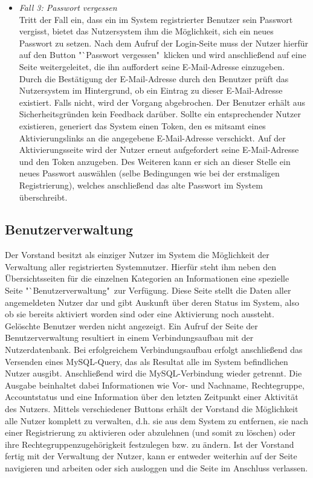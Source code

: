 \documentclass[fontsize = 12pt, paper = a4]{scrreprt}
\begin{document}
\begin{itemize}

\item \textit{Fall 3: Passwort vergessen} \\
Tritt der Fall ein, dass ein im System registrierter Benutzer sein Passwort vergisst, bietet das Nutzersystem ihm die Möglichkeit, sich ein neues Passwort zu setzen. Nach dem Aufruf der Login-Seite muss der Nutzer hierfür auf den Button "`Passwort vergessen"\ klicken und wird anschließend auf eine Seite weitergeleitet, die ihn auffordert seine E-Mail-Adresse einzugeben. Durch die Bestätigung der E-Mail-Adresse durch den Benutzer prüft das Nutzersystem im Hintergrund, ob ein Eintrag zu dieser E-Mail-Adresse existiert. Falls nicht, wird der Vorgang abgebrochen. Der Benutzer erhält aus Sicherheitsgründen kein Feedback darüber. Sollte ein entsprechender Nutzer existieren, generiert das System einen Token, den es mitsamt eines Aktivierungslinks an die angegebene E-Mail-Adresse verschickt. Auf der Aktivierungsseite wird der Nutzer erneut aufgefordert seine E-Mail-Adresse und den Token anzugeben. Des Weiteren kann er sich an dieser Stelle ein neues Passwort auswählen (selbe Bedingungen wie bei der erstmaligen Registrierung), welches anschließend das alte Passwort im System überschreibt.

\end{itemize}

\newpage

\subsection{Benutzerverwaltung}

Der Vorstand besitzt als einziger Nutzer im System die Möglichkeit der Verwaltung aller registrierten Systemnutzer. Hierfür steht ihm neben den Übersichtsseiten für die einzelnen Kategorien an Informationen eine spezielle Seite "`Benutzerverwaltung"\ zur Verfügung. Diese Seite stellt die Daten aller angemeldeten Nutzer dar und gibt Auskunft über deren Status im System, also ob sie bereits aktiviert worden sind oder eine Aktivierung noch aussteht. Gelöschte Benutzer werden nicht angezeigt. Ein Aufruf der Seite der Benutzerverwaltung resultiert in einem Verbindungsaufbau mit der Nutzerdatenbank. Bei erfolgreichem Verbindungsaufbau erfolgt anschließend das Versenden eines MySQL-Query, das als Resultat alle im System befindlichen Nutzer ausgibt. Anschließend wird die MySQL-Verbindung wieder getrennt. Die Ausgabe beinhaltet dabei Informationen wie Vor- und Nachname, Rechtegruppe, Accountstatus und eine Information über den letzten Zeitpunkt einer Aktivität des Nutzers. Mittels verschiedener Buttons erhält der Vorstand die Möglichkeit alle Nutzer komplett zu verwalten, d.h. sie aus dem System zu entfernen, sie nach einer Registrierung zu aktivieren oder abzulehnen (und somit zu löschen) oder ihre Rechtegruppenzugehörigkeit festzulegen bzw. zu ändern. Ist der Vorstand fertig mit der Verwaltung der Nutzer, kann er entweder weiterhin auf der Seite navigieren  und arbeiten oder sich ausloggen und die Seite im Anschluss verlassen.
\end{document}
